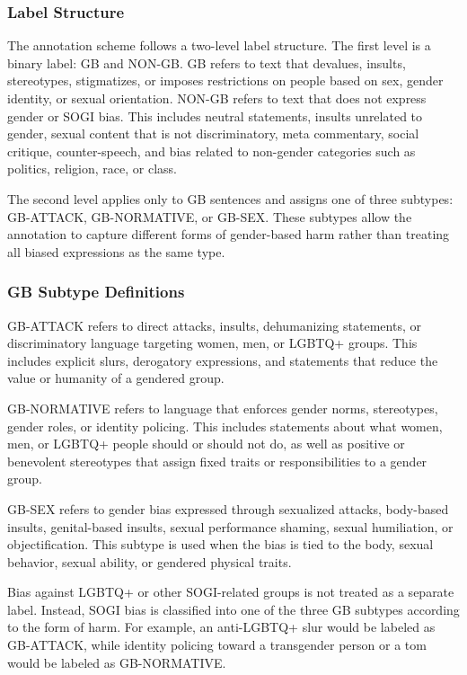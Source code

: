 \documentclass[12pt,oneside,openright,a4paper]{cpe-english-project}
\begin{document}
\subsubsection{Label Structure}

The annotation scheme follows a two-level label structure. The first level is a binary label: GB and NON-GB. GB refers to text that devalues, insults, stereotypes, stigmatizes, or imposes restrictions on people based on sex, gender identity, or sexual orientation. NON-GB refers to text that does not express gender or SOGI bias. This includes neutral statements, insults unrelated to gender, sexual content that is not discriminatory, meta commentary, social critique, counter-speech, and bias related to non-gender categories such as politics, religion, race, or class.

The second level applies only to GB sentences and assigns one of three subtypes: GB-ATTACK, GB-NORMATIVE, or GB-SEX. These subtypes allow the annotation to capture different forms of gender-based harm rather than treating all biased expressions as the same type.

\subsubsection{GB Subtype Definitions}

GB-ATTACK refers to direct attacks, insults, dehumanizing statements, or discriminatory language targeting women, men, or LGBTQ+ groups. This includes explicit slurs, derogatory expressions, and statements that reduce the value or humanity of a gendered group.

GB-NORMATIVE refers to language that enforces gender norms, stereotypes, gender roles, or identity policing. This includes statements about what women, men, or LGBTQ+ people should or should not do, as well as positive or benevolent stereotypes that assign fixed traits or responsibilities to a gender group.

GB-SEX refers to gender bias expressed through sexualized attacks, body-based insults, genital-based insults, sexual performance shaming, sexual humiliation, or objectification. This subtype is used when the bias is tied to the body, sexual behavior, sexual ability, or gendered physical traits.

Bias against LGBTQ+ or other SOGI-related groups is not treated as a separate label. Instead, SOGI bias is classified into one of the three GB subtypes according to the form of harm. For example, an anti-LGBTQ+ slur would be labeled as GB-ATTACK, while identity policing toward a transgender person or a tom would be labeled as GB-NORMATIVE.
\end{document}
